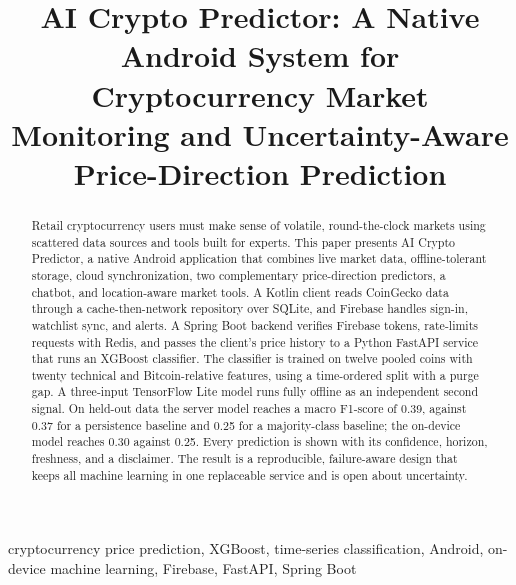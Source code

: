 \documentclass[conference]{IEEEtran}
\begin{document}
\title{AI Crypto Predictor: A Native Android System for Cryptocurrency Market Monitoring and Uncertainty-Aware Price-Direction Prediction}

\author{
}

\maketitle

\begin{abstract}
Retail cryptocurrency users must make sense of volatile, round-the-clock markets using scattered data sources and tools built for experts. This paper presents AI Crypto Predictor, a native Android application that combines live market data, offline-tolerant storage, cloud synchronization, two complementary price-direction predictors, a chatbot, and location-aware market tools. A Kotlin client reads CoinGecko data through a cache-then-network repository over SQLite, and Firebase handles sign-in, watchlist sync, and alerts. A Spring Boot backend verifies Firebase tokens, rate-limits requests with Redis, and passes the client's price history to a Python FastAPI service that runs an XGBoost classifier. The classifier is trained on twelve pooled coins with twenty technical and Bitcoin-relative features, using a time-ordered split with a purge gap. A three-input TensorFlow Lite model runs fully offline as an independent second signal. On held-out data the server model reaches a macro F1-score of 0.39, against 0.37 for a persistence baseline and 0.25 for a majority-class baseline; the on-device model reaches 0.30 against 0.25. Every prediction is shown with its confidence, horizon, freshness, and a disclaimer. The result is a reproducible, failure-aware design that keeps all machine learning in one replaceable service and is open about uncertainty.
\end{abstract}

\begin{IEEEkeywords}
cryptocurrency price prediction, XGBoost, time-series classification, Android, on-device machine learning, Firebase, FastAPI, Spring Boot
\end{IEEEkeywords}
\end{document}
